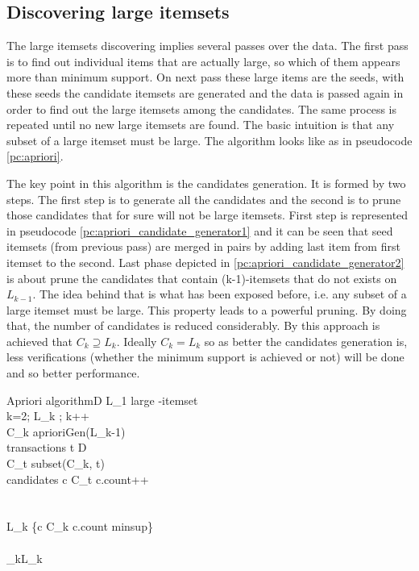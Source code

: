 \subsection{Discovering large itemsets}\label{ss:discovering_large_itemsets}

The large itemsets discovering implies several passes over the data. The first
pass is to find out individual items that are actually large, so which of them
appears more than minimum support. 
On next pass these large items are the seeds, with these
seeds the candidate itemsets are generated and the data is passed again in order 
to find out the large itemsets among the candidates. The same process is repeated 
until no new large itemsets are found. The basic intuition is that any subset of
a large itemset must be large. The algorithm looks like as in pseudocode
\ref{pc:apriori}.

The key point in this algorithm is the candidates generation. It is formed by
two steps. The first step is to generate all the candidates and the second is to
prune those candidates that for sure will not be large itemsets. First step is
represented in pseudocode \ref{pc:apriori_candidate_generator1} and it can be
seen that seed itemsets (from previous pass) are merged in pairs by adding last
item from first itemset to the second. Last phase depicted in
\ref{pc:apriori_candidate_generator2} is about prune the candidates
that contain (k-1)-itemsets that do not exists on $L_{k-1}$. The idea behind
that is what has been exposed before, i.e. any subset of a large itemset must
be large. This property leads to a powerful pruning. By doing that, the 
number of candidates is reduced considerably. By this approach is achieved 
that $C_{k} \supseteq L_{k}$. Ideally $C_{k} = L_{k}$
so as better the candidates generation is, less verifications (whether the minimum
support is achieved or not) will be done and so better performance.

\begin{pseudocode}{Apriori algorithm}{D}
\label{pc:apriori}
    L_{1} \GETS large -itemset
	\\
    \FOR k=2; L_{k} \neq \emptyset; k++ \DO
	\BEGIN
         \\
        C_{k} \GETS aprioriGen(L_{k-1})\\
        \FORALL transactions \quad t \in D \DO
        \BEGIN
             \\
            C_{t} \GETS subset(C_{k}, t)\\
            \FORALL candidates \quad c \in C_{t} \DO
            \BEGIN
                c.count++\\
            \END\\
        \END\\
        L_{k} \GETS \{c \in C_{k} \mid c.count \geq minsup\}
	\END\\
	\\

    \RETURN \bigcup_{k}L_{k}
\end{pseudocode}

